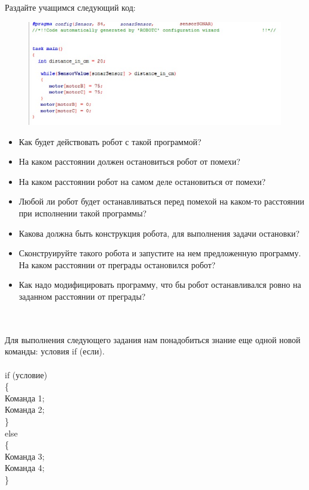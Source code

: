 {\hypertarget{lesson15x2}{}}\\\\

Раздайте учащимся следующий код:

\begin{figure}[h!]
	\begin{center}
		\includegraphics[width=1\linewidth]{chapters/chapter15/images/1}
		\caption{}
		\label{ris:image15x1}
	\end{center}
\end{figure}	

\begin{itemize}
	\renewcommand{\labelitemi}{\stepcounter{questionsStopSonar}\thequestionsStopSonar)}
	\item Как будет действовать робот с такой программой?
	\item На каком расстоянии должен остановиться робот от помехи? 
	\item  На каком расстоянии робот на самом деле остановиться от помехи?
	\item Любой ли робот будет останавливаться перед помехой на каком-то расстоянии при исполнении такой программы?
	\item  Какова должна быть конструкция робота, для выполнения задачи остановки?
	\item Сконструируйте такого робота и запустите на нем предложенную программу. На каком расстоянии от преграды остановился робот?
	\item Как надо модифицировать программу, что бы робот останавливался ровно на заданном расстоянии от преграды?
\end{itemize}
\clearpage
{\hypertarget{lesson15x3}{}}\\\\	

Для выполнения следующего задания нам понадобиться знание еще одной новой команды: условия if (если).\\\\
if (условие)\\
\{\\
\indent Команда 1;\\
\indent Команда 2;\\
\}\\
else\\
\{\\
\indent Команда 3;\\
\indent Команда 4;\\
\}\\\\

